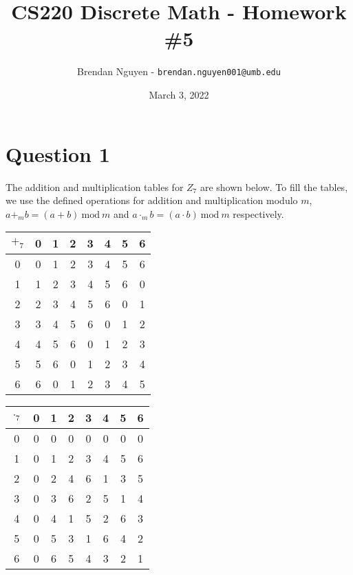 \documentclass[letterpaper, 12pt]{article}
\title{CS220 Discrete Math - Homework \#5}
\author{Brendan Nguyen - \texttt{brendan.nguyen001@umb.edu}}
\date{March 3, 2022}
\newcommand{\Mod}[1]{\ \mathrm{mod}\ #1}
\begin{document}
\maketitle

\section*{Question 1}

The addition and multiplication tables for $Z_7$ are shown below. To fill the tables, we use the defined operations for addition and multiplication modulo $m$, $a +_m b = (a+b) \Mod{m}$ and $a \cdot_m b = (a \cdot b) \Mod{m}$ respectively.

\begin{multicols}{2}
    \begin{table}[H]
        \begin{tabular}{c|c c c c c c c}
             $+_7$ & 0 & 1 & 2 & 3 & 4 & 5 & 6\\
             \hline
             0 & 0 & 1 & 2 & 3 & 4 & 5 & 6\\
             1 & 1 & 2 & 3 & 4 & 5 & 6 & 0\\
             2 & 2 & 3 & 4 & 5 & 6 & 0 & 1\\
             3 & 3 & 4 & 5 & 6 & 0 & 1 & 2\\
             4 & 4 & 5 & 6 & 0 & 1 & 2 & 3\\
             5 & 5 & 6 & 0 & 1 & 2 & 3 & 4\\
             6 & 6 & 0 & 1 & 2 & 3 & 4 & 5
        \end{tabular}
    \end{table}
    
    \begin{table}[H]
        \begin{tabular}{c|c c c c c c c}
             $\cdot_7$ & 0 & 1 & 2 & 3 & 4 & 5 & 6\\
             \hline
             0 & 0 & 0 & 0 & 0 & 0 & 0 & 0\\
             1 & 0 & 1 & 2 & 3 & 4 & 5 & 6\\
             2 & 0 & 2 & 4 & 6 & 1 & 3 & 5\\
             3 & 0 & 3 & 6 & 2 & 5 & 1 & 4\\
             4 & 0 & 4 & 1 & 5 & 2 & 6 & 3\\
             5 & 0 & 5 & 3 & 1 & 6 & 4 & 2\\
             6 & 0 & 6 & 5 & 4 & 3 & 2 & 1
        \end{tabular}
    \end{table}
\end{multicols}
\end{document}
